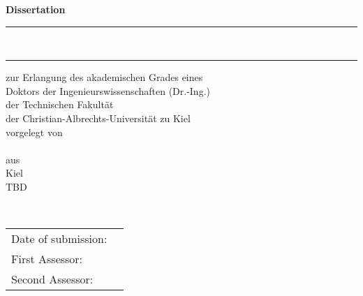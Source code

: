 \begin{center}
	\fontsize{16}{18}\selectfont
	{\textbf{\huge Dissertation}} \\
	\vspace{2cm}
	\hrule
	\vspace{0.4cm}
	\textbf{\Large \MAtitle}\\
	\vspace{0.3cm}
	\hrule
	\vspace{2cm}
	{\large zur Erlangung des akademischen Grades eines \\ Doktors der Ingenieurswissenschaften (Dr.-Ing.) \\ der Technischen Fakultät \\ der Christian-Albrechts-Universität zu Kiel} \\
	\vspace{2cm}	
          {\small vorgelegt von} \\
	\vspace{0.2cm}		
	\large{\Author} \\
	\vspace{1cm}
         {\small aus} \\
	\vspace{0.2cm}
	{\large Kiel} \\
	\vspace{2cm}	
	{\large TBD} \\
	\vspace{1cm}
	\vspace{1cm}
	
	
\end{center}
\newpage

\ \vfill
\begin{tabularx}{0.9\textwidth}{l l}
	Date of submission: & \DateOfSubmission \\
	First Assessor: &\CorrectorA \\
	Second Assessor: & \CorrectorB \\
\end{tabularx}	
\newpage
